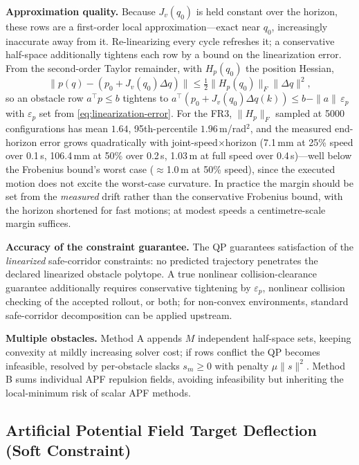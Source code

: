 \textbf{Approximation quality.} Because \(J_v(q_0)\) is held constant over
the horizon, these rows are a first-order local approximation---exact near
\(q_0\), increasingly inaccurate away from it. Re-linearizing every cycle
refreshes it; a conservative half-space additionally tightens each row by
a bound on the linearization error. From the second-order Taylor
remainder, with \(H_p(q_0)\) the position Hessian,
\begin{equation}
\label{eq:linearization-error}
\|p(q) - (p_0 + J_v(q_0)\Delta q)\|
\leq \tfrac{1}{2} \|H_p(q_0)\|_F \|\Delta q\|^2,
\end{equation}
so an obstacle row \(a^\top p\le b\) tightens to
\(a^\top(p_0+J_v(q_0)\Delta q(k))\le b-\|a\|\,\varepsilon_p\) with
\(\varepsilon_p\) set from \eqref{eq:linearization-error}. For the FR3,
\(\|H_p\|_F\) sampled at 5000 configurations has mean \(1.64\),
95th-percentile \(1.96\)\,m/rad\(^2\), and the measured end-horizon error
grows quadratically with joint-speed\(\times\)horizon (7.1\,mm at 25\%
speed over 0.1\,s, 106.4\,mm at 50\% over 0.2\,s, 1.03\,m at full speed
over 0.4\,s)---well below the Frobenius bound's worst case
(\(\approx\)1.0\,m at 50\% speed), since the executed motion does not
excite the worst-case curvature. In practice the margin should be set
from the \emph{measured} drift rather than the conservative Frobenius
bound, with the horizon shortened for fast motions; at modest speeds a
centimetre-scale margin suffices.

\textbf{Accuracy of the constraint guarantee.} The QP guarantees
satisfaction of the \emph{linearized} safe-corridor constraints: no
predicted trajectory penetrates the declared linearized obstacle polytope.
A true nonlinear collision-clearance guarantee additionally requires
conservative tightening by \(\varepsilon_p\), nonlinear collision checking
of the accepted rollout, or both; for non-convex environments, standard
safe-corridor decomposition \cite{safe_corridor} can be applied upstream.

\textbf{Multiple obstacles.} Method A appends \(M\) independent half-space
sets, keeping convexity at mildly increasing solver cost; if rows conflict
the QP becomes infeasible, resolved by per-obstacle slacks \(s_m \geq 0\)
with penalty \(\mu \|s\|^2\). Method B sums individual APF repulsion
fields, avoiding infeasibility but inheriting the local-minimum risk of
scalar APF methods.

\subsection{Artificial Potential Field Target Deflection (Soft
Constraint)}\label{b.-artificial-potential-field-target-deflection-soft-constraint}

